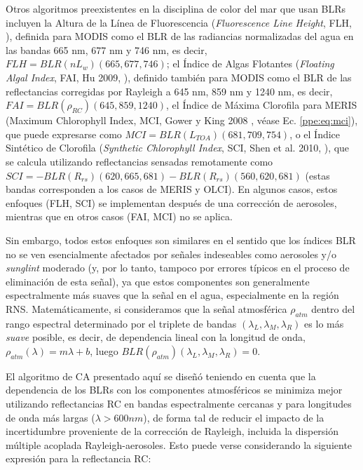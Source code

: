     Otros algoritmos preexistentes en la disciplina de color del mar que usan BLRs incluyen la Altura de la Línea de Fluorescencia (\textit{Fluorescence Line Height}, FLH, \cite{letelier1996}), definida para MODIS como el BLR de las radiancias normalizadas del agua en las bandas 665 nm, 677 nm y 746 nm, es decir, $FLH = BLR(nL_{w})(665,677,746)$; el Índice de Algas Flotantes (\textit{Floating Algal Index}, FAI, Hu 2009, \cite{hu2009}), definido también para MODIS como el BLR de las reflectancias corregidas por Rayleigh a 645 nm, 859 nm y 1240 nm, es decir, $ FAI=BLR(\rho_{RC})(645,859,1240)$, el Índice de Máxima Clorofila para MERIS (Maximum Chlorophyll Index, MCI, Gower y King 2008 \cite{gower2008}, véase Ec. \ref{ppe:eq:mci}), que puede expresarse como $MCI=BLR(L_{TOA})(681,709,754)$, o el Índice Sintético de Clorofila (\textit{Synthetic Chlorophyll Index}, SCI, Shen et al. 2010, \cite{shen2010}), que se calcula utilizando reflectancias sensadas remotamente como $SCI=-BLR(R_{rs})(620,665,681)-BLR(R_{rs})(560,620,681)$ (estas bandas corresponden a los casos de MERIS y OLCI). En algunos casos, estos enfoques (FLH, SCI) se implementan después de una corrección de aerosoles, mientras que en otros casos (FAI, MCI) no se aplica.
    
    Sin embargo, todos estos enfoques son similares en el sentido que los índices BLR no se ven esencialmente afectados por señales indeseables como aerosoles y/o \textit{sunglint} moderado (y, por lo tanto, tampoco por errores típicos en el proceso de eliminación de esta señal), ya que estos componentes son generalmente espectralmente más suaves que la señal en el agua, especialmente en la región RNS. Matemáticamente, si consideramos que la señal atmosférica $\rho_{atm}$ dentro del rango espectral determinado por el triplete de bandas $(\lambda_{L},\lambda_{M},\lambda_{R})$ es lo más \textit{suave} posible, es decir, de dependencia lineal con la longitud de onda, $\rho_{atm}(\lambda)=m\lambda+b $, luego $BLR(\rho_{atm})(\lambda_{L},\lambda_{M},\lambda_{R})=0$.
    
    El algoritmo de CA presentado aquí se diseñó teniendo en cuenta que la dependencia de los BLRs con los componentes atmosféricos se minimiza mejor utilizando reflectancias RC en bandas espectralmente cercanas y para longitudes de onda más largas ($\lambda>600nm $), de forma tal de reducir el impacto de la incertidumbre proveniente de la corrección de Rayleigh, incluida la dispersión múltiple acoplada Rayleigh-aerosoles. Esto puede verse considerando la siguiente expresión para la reflectancia RC:
    
